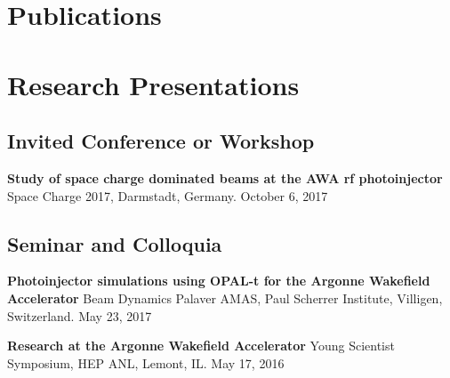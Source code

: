 \documentclass[11pt,a4paper,sans]{moderncv}        %
\begin{document}
\section{Publications}
%






\section{Research Presentations}

\subsection{Invited Conference or Workshop} %
\textbf{Study of space charge dominated beams at the AWA rf photoinjector}\newline
Space Charge 2017, Darmstadt, Germany. October 6, 2017

\subsection{Seminar and Colloquia}
\textbf{Photoinjector simulations using OPAL-t for the Argonne Wakefield Accelerator}\newline
Beam Dynamics Palaver AMAS, Paul Scherrer Institute, Villigen, Switzerland. May 23, 2017 
\vspace{0.3em}

\textbf{Research at the Argonne Wakefield Accelerator}\newline
Young Scientist Symposium, HEP ANL, Lemont, IL. May 17, 2016 
\vspace{0.3em}
\end{document}
